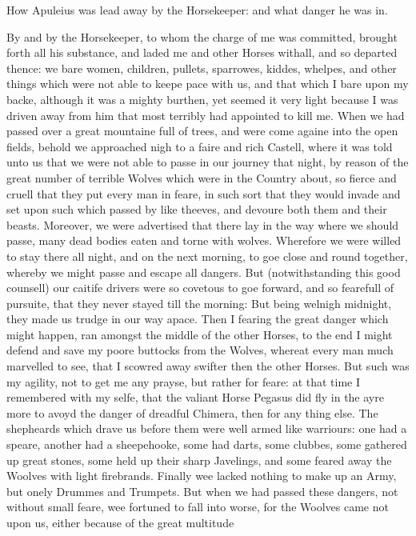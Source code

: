
How Apuleius was lead away by the Horsekeeper: and what danger he was in.

By and by the Horsekeeper, to whom the charge of me was committed, brought
forth all his substance, and laded me and other Horses withall, and so departed
thence: we bare women, children, pullets, sparrowes, kiddes, whelpes, and other
things which were not able to keepe pace with us, and that which I bare upon my
backe, although it was a mighty burthen, yet seemed it very light because I was
driven away from him that most terribly had appointed to kill me. When we had
passed over a great mountaine full of trees, and were come againe into the open
fields, behold we approached nigh to a faire and rich Castell, where it was
told unto us that we were not able to passe in our journey that night, by
reason of the great number of terrible Wolves which were in the Country about,
so fierce and cruell that they put every man in feare, in such sort that they
would invade and set upon such which passed by like theeves, and devoure both
them and their beasts. Moreover, we were advertised that there lay in the way
where we should passe, many dead bodies eaten and torne with wolves. Wherefore
we were willed to stay there all night, and on the next morning, to goe close
and round together, whereby we might passe and escape all dangers. But
(notwithstanding this good counsell) our caitife drivers were so covetous to
goe forward, and so fearefull of pursuite, that they never stayed till the
morning: But being welnigh midnight, they made us trudge in our way apace. Then
I fearing the great danger which might happen, ran amongst the middle of the
other Horses, to the end I might defend and save my poore buttocks from the
Wolves, whereat every man much marvelled to see, that I scowred away swifter
then the other Horses. But such was my agility, not to get me any prayse, but
rather for feare: at that time I remembered with my selfe, that the valiant
Horse Pegasus did fly in the ayre more to avoyd the danger of dreadful Chimera,
then for any thing else. The shepheards which drave us before them were well
armed like warriours: one had a speare, another had a sheepehooke, some had
darts, some clubbes, some gathered up great stones, some held up their sharp
Javelings, and some feared away the Woolves with light firebrands. Finally wee
lacked nothing to make up an Army, but onely Drummes and Trumpets. But when we
had passed these dangers, not without small feare, wee fortuned to fall into
worse, for the Woolves came not upon us, either because of the great multitude

